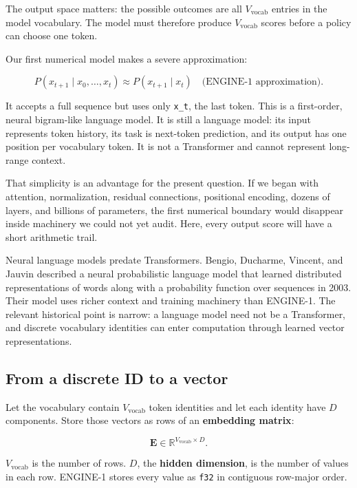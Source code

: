 \documentclass[
  10pt,
]{article}
\begin{document}
The output space matters: the possible outcomes are all
\(V_{\mathrm{vocab}}\) entries in the model vocabulary. The model must
therefore produce \(V_{\mathrm{vocab}}\) scores before a policy can
choose one token.

Our first numerical model makes a severe approximation:

\[
P\!\left(x_{t+1}\mid x_0,\ldots,x_t\right)
\approx P\!\left(x_{t+1}\mid x_t\right)
\quad\text{(ENGINE-1 approximation).}
\]

It accepts a full sequence but uses only \texttt{x\_t}, the last token.
This is a first-order, neural bigram-like language model. It is still a
language model: its input represents token history, its task is
next-token prediction, and its output has one position per vocabulary
token. It is not a Transformer and cannot represent long-range context.

That simplicity is an advantage for the present question. If we began
with attention, normalization, residual connections, positional
encoding, dozens of layers, and billions of parameters, the first
numerical boundary would disappear inside machinery we could not yet
audit. Here, every output score will have a short arithmetic trail.

Neural language models predate Transformers. Bengio, Ducharme, Vincent,
and Jauvin described a neural probabilistic language model that learned
distributed representations of words along with a probability function
over sequences in 2003. Their model uses richer context and training
machinery than ENGINE-1. The relevant historical point is narrow: a
language model need not be a Transformer, and discrete vocabulary
identities can enter computation through learned vector representations.

\subsection{From a discrete ID to a
vector}\label{from-a-discrete-id-to-a-vector}

Let the vocabulary contain \(V_{\mathrm{vocab}}\) token identities and
let each identity have \(D\) components. Store those vectors as rows of
an \textbf{embedding matrix}:

\[
\mathbf{E}\in\mathbb{R}^{V_{\mathrm{vocab}}\times D}.
\]

\(V_{\mathrm{vocab}}\) is the number of rows. \(D\), the \textbf{hidden
dimension}, is the number of values in each row. ENGINE-1 stores every
value as \texttt{f32} in contiguous row-major order.
\end{document}
